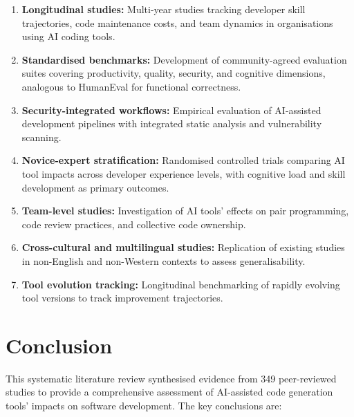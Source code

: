 \documentclass[journal,twoside,10pt]{IEEEtran}
\begin{document}
\begin{enumerate}
  \item \textbf{Longitudinal studies:} Multi-year studies tracking developer
        skill trajectories, code maintenance costs, and team dynamics in
        organisations using AI coding tools.
  \item \textbf{Standardised benchmarks:} Development of community-agreed
        evaluation suites covering productivity, quality, security, and
        cognitive dimensions, analogous to HumanEval for functional correctness.
  \item \textbf{Security-integrated workflows:} Empirical evaluation of
        AI-assisted development pipelines with integrated static analysis and
        vulnerability scanning.
  \item \textbf{Novice-expert stratification:} Randomised controlled trials
        comparing AI tool impacts across developer experience levels, with
        cognitive load and skill development as primary outcomes.
  \item \textbf{Team-level studies:} Investigation of AI tools' effects on
        pair programming, code review practices, and collective code ownership.
  \item \textbf{Cross-cultural and multilingual studies:} Replication of
        existing studies in non-English and non-Western contexts to assess
        generalisability.
  \item \textbf{Tool evolution tracking:} Longitudinal benchmarking of rapidly
        evolving tool versions to track improvement trajectories.
\end{enumerate}

\section{Conclusion}
\label{sec:conclusion}

This systematic literature review synthesised evidence from 349 peer-reviewed
studies to provide a comprehensive assessment of AI-assisted code generation
tools' impacts on software development. The key conclusions are:
\end{document}
